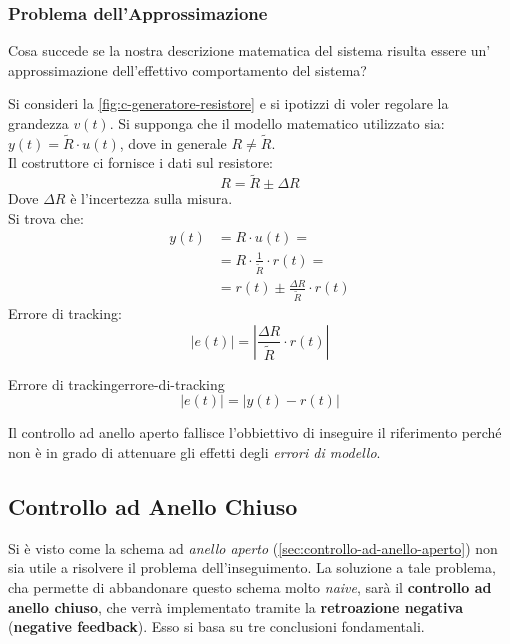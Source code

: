 \documentclass[12pt]{article}
\begin{document}
\subsubsection{Problema dell'Approssimazione}\label{sec:problema-dell-approssimazione}
Cosa succede se la nostra descrizione matematica del sistema risulta essere un' approssimazione dell'effettivo comportamento del sistema?
\begin{example}{}{}
    Si consideri la \autoref{fig:c-generatore-resistore} e si ipotizzi di voler regolare la grandezza $v(t)$. Si supponga che il modello matematico utilizzato sia: $y(t) = \widetilde{R} \cdot u(t)$, dove in generale $R \neq \widetilde{R}$. \\
    Il costruttore ci fornisce i dati sul resistore:
    \[ R = \widetilde{R} \pm \Delta R \]
    Dove $\Delta R$ \`e l'incertezza sulla misura. \\
    Si trova che:
    \begin{align*}
        y(t) & = R \cdot u(t) = \\
             & = R \cdot \frac{1}{\widetilde{R}} \cdot r(t) = \\
             & = r(t) \pm  \frac{\Delta R}{\widetilde{R}} \cdot r(t)
    \end{align*}
    Errore di tracking:
    \[ | e(t) | = \left| \frac{\Delta R}{\widetilde{R}} \cdot r(t) \right| \]
\end{example}

\begin{definition}{Errore di tracking}{errore-di-tracking}
    \[ | e(t) | = |y(t) - r(t)| \]
\end{definition}

Il controllo ad anello aperto fallisce l'obbiettivo di inseguire il riferimento perch\'e non \`e in grado di attenuare gli effetti degli \emph{errori di modello}.

\subsection{Controllo ad Anello Chiuso}\label{sec:controllo-ad-anello-chiuso}
Si \`e visto come la schema ad \emph{anello aperto} (\ref{sec:controllo-ad-anello-aperto}) non sia utile a risolvere il problema dell'inseguimento. La soluzione a tale problema, cha permette di abbandonare questo schema molto \emph{naive}, sar\`a il \textbf{controllo ad anello chiuso}, che verr\`a implementato tramite la \textbf{retroazione negativa} (\textbf{negative feedback}). Esso si basa su tre conclusioni fondamentali.
\end{document}
